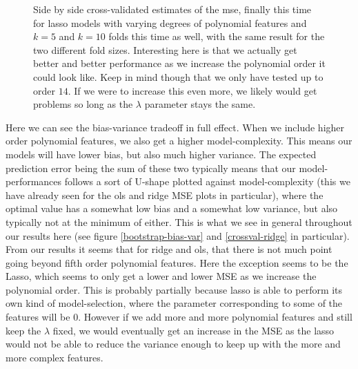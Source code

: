 \documentclass{article}
\begin{document}
\begin{figure}
    \centering
    \quad
    \caption{Side by side cross-validated estimates of the mse, finally this time for lasso models with varying degrees of polynomial features and $k=5$ and
        $k=10$ folds this time as well, with the same result for the two
        different fold sizes. Interesting here is that we actually get better
        and better performance as we increase the polynomial order it could look
        like. Keep in mind though that we only have tested up to order $14$. If
        we were to increase this even more, we likely would get problems so long
        as the $\lambda$ parameter stays the same.}
    \label{crossval-lasso}
\end{figure}

Here we can see the bias-variance tradeoff in full effect. When we include
higher order polynomial features, we also get a higher model-complexity. This
means our models will have lower bias, but also much higher variance. The
expected prediction error being the sum of these two typically means that our
model-performances follows a sort of U-shape plotted against model-complexity
(this we have already seen for the ols and ridge MSE plots in particular),
where the optimal value has a somewhat low bias and a somewhat low variance, but
also typically not at the minimum of either. This is what we see in general
throughout our results here (see figure \ref{bootstrap-bias-var} and
\ref{crossval-ridge} in particular). From our results it seems that for ridge
and ols, that there is not much point going beyond fifth order polynomial
features. Here the exception seems to be the Lasso, which seems to only get a
lower and lower MSE as we increase the polynomial order.  This is probably
partially because lasso is able to perform its own kind of model-selection,
where the parameter corresponding to some of the features will be $0$. However
if we add more and more polynomial features and still keep the $\lambda$ fixed,
we would eventually get an increase in the MSE as the lasso would not be able to
reduce the variance enough to keep up with the more and more complex features.
\end{document}
